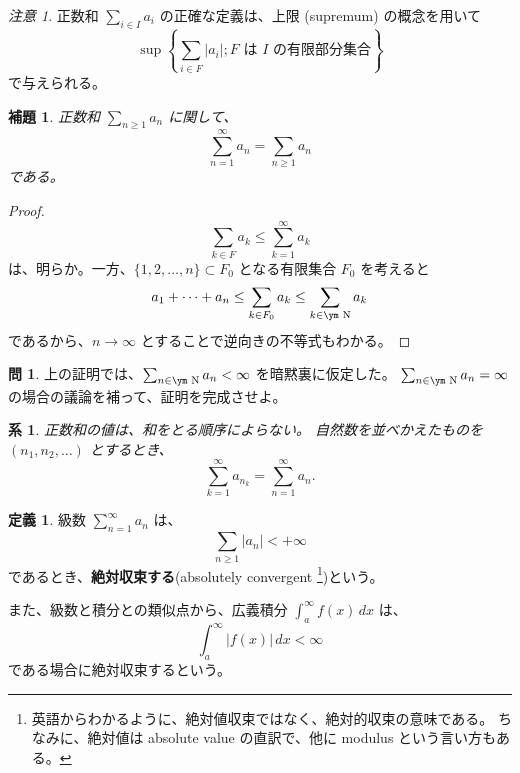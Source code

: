 \documentclass[a4paper]{jsarticle}
\newtheorem{Lemma}[Theorem]{補題}
\newtheorem{Corollary}[Theorem]{系}
\theoremstyle{definition}
\newtheorem{Definition}[Theorem]{定義}
\newtheorem{Exercise}{問}%
\theoremstyle{remark}
\newtheorem{Remark}{注意}
\newcommand{\N}{\text{\ym N}}
\begin{document}
\begin{Remark}
{\small
正数和 $\displaystyle \sum_{i \in I} a_i$ の正確な定義は、上限 (supremum) の概念を用いて
\[
 \sup
\left\{ 
\sum_{i \in F} |a_i|; \text{$F$ は $I$ の有限部分集合} 
\right\}
\]
で与えられる。}
\end{Remark}

\begin{Lemma}
正数和 $\sum_{n\geq 1} a_n$ に関して、
\[
\sum_{n=1}^\infty a_n = \sum_{n \geq 1} a_n 
\]
である。
\end{Lemma}

\begin{proof}
\[
\sum_{k \in F} a_k \leq \sum_{k=1}^\infty a_k 
\]
は、明らか。一方、$\{ 1,2, \dots,n\} \subset F_0$ となる有限集合 $F_0$ を考えると
\[
a_1 + \dots + a_n \leq \sum_{k \in F_0} a_k \leq \sum_{k \in \N} a_k 
\]
であるから、$n \to \infty$ とすることで逆向きの不等式もわかる。


\end{proof}

\begin{Exercise}
上の証明では、$\sum_{n \in \N} a_n < \infty$ を暗黙裏に仮定した。
$\sum_{n \in \N} a_n = \infty$ の場合の議論を補って、証明を完成させよ。
\end{Exercise}

\begin{Corollary}
正数和の値は、和をとる順序によらない。
自然数を並べかえたものを $(n_1, n_2, \dots)$ とするとき、
\[
\sum_{k=1}^\infty a_{n_k} = 
\sum_{n=1}^\infty a_n.
\]
\end{Corollary}

\begin{Definition}
級数 $\displaystyle \sum_{n = 1}^\infty a_n$ は、
\[
\sum_{n \geq 1} |a_n| < +\infty 
\]
であるとき、{\bf 絶対収束する}(absolutely convergent
\footnote{英語からわかるように、絶対値収束ではなく、絶対的収束の意味である。
  ちなみに、絶対値は absolute value の直訳で、他に modulus という言い方もある。})という。

また、級数と積分との類似点から、広義積分 $\displaystyle \int_a^\infty f(x)\, dx$ は、
\[
\int_a^\infty |f(x)|\, dx < \infty
\]
である場合に絶対収束するという。
\end{Definition} 
\end{document}
